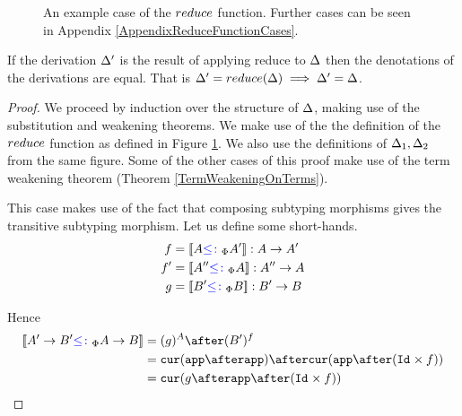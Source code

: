 \begin{figure}[H]
\begin{framed}
    \end{framed}

    \caption{An example case of the $reduce$ function. Further cases can be seen in Appendix \ref{AppendixReduceFunctionCases}.}
    \label{ReduceFunctionCases}
\end{figure}


\begin{framed}
    \begin{theorem}\label{ReductionPreservesDenotations}
       If the derivation $\Delta'$ is the result of applying  reduce to $\Delta$ then the denotations of the derivations are equal. That is $\Delta' = reduce(\Delta) \implies \Delta' = \Delta$.
    \end{theorem}
    
    
    \begin{proof}
        We proceed by induction over the structure of $\Delta$, making use of the substitution and weakening theorems. We make use of the the definition of the $reduce$ function as defined in Figure \ref{ReduceFunctionCases}. We also use the definitions of $\Delta_1, \Delta_2$ from the same figure. Some of the other cases of this proof make use of the term weakening theorem (Theorem \ref{TermWeakeningOnTerms}).

        \case{\vapply}
        This case makes use of the fact that composing subtyping morphisms gives the transitive subtyping morphism. Let us define some short-hands.
            \begin{align*}
                f & = {\bf [\![}A{\color{blue} \leq\colon}_\Phi A'{\bf ]\!]}: A\rightarrow A' \\
                f' & = {\bf [\![}A''{\color{blue} \leq\colon}_\Phi A{\bf ]\!]}: A'' \rightarrow A \\
                g & = {\bf [\![}B' {\color{blue} \leq\colon}_\Phi B{\bf ]\!]}: B' \rightarrow B \\
            \end{align*}
    
            Hence 
            \begin{align*}
                \deno{\fntype{A'}{B'}\subtypep \ab} & = (g)^A \after (B')^f \\
                & = \cur{\app\after \app}\after\cur{\app\after(\Id{}\times f)}\\
                & = \cur {g\after\app\after(\Id{}\times f)}
            \end{align*}
    

\end{proof}
\end{framed}
